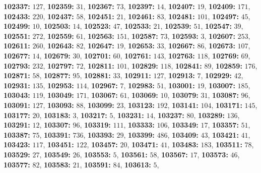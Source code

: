 \textsf{\bfseries 102337:} $127$, \textsf{\bfseries 102359:} $31$, \textsf{\bfseries 102367:} $73$, \textsf{\bfseries 102397:} $14$, \textsf{\bfseries 102407:} $19$, \textsf{\bfseries 102409:} $171$, \textsf{\bfseries 102433:} $220$, \textsf{\bfseries 102437:} $58$, \textsf{\bfseries 102451:} $21$, \textsf{\bfseries 102461:} $83$, \textsf{\bfseries 102481:} $101$, \textsf{\bfseries 102497:} $45$, \textsf{\bfseries 102499:} $10$, \textsf{\bfseries 102503:} $14$, \textsf{\bfseries 102523:} $47$, \textsf{\bfseries 102533:} $21$, \textsf{\bfseries 102539:} $51$, \textsf{\bfseries 102547:} $39$, \textsf{\bfseries 102551:} $272$, \textsf{\bfseries 102559:} $61$, \textsf{\bfseries 102563:} $151$, \textsf{\bfseries 102587:} $73$, \textsf{\bfseries 102593:} $3$, \textsf{\bfseries 102607:} $253$, \textsf{\bfseries 102611:} $260$, \textsf{\bfseries 102643:} $82$, \textsf{\bfseries 102647:} $19$, \textsf{\bfseries 102653:} $33$, \textsf{\bfseries 102667:} $86$, \textsf{\bfseries 102673:} $107$, \textsf{\bfseries 102677:} $14$, \textsf{\bfseries 102679:} $30$, \textsf{\bfseries 102701:} $60$, \textsf{\bfseries 102761:} $143$, \textsf{\bfseries 102763:} $118$, \textsf{\bfseries 102769:} $69$, \textsf{\bfseries 102793:} $232$, \textsf{\bfseries 102797:} $72$, \textsf{\bfseries 102811:} $101$, \textsf{\bfseries 102829:} $118$, \textsf{\bfseries 102841:} $89$, \textsf{\bfseries 102859:} $176$, \textsf{\bfseries 102871:} $58$, \textsf{\bfseries 102877:} $95$, \textsf{\bfseries 102881:} $33$, \textsf{\bfseries 102911:} $127$, \textsf{\bfseries 102913:} $7$, \textsf{\bfseries 102929:} $42$, \textsf{\bfseries 102931:} $135$, \textsf{\bfseries 102953:} $114$, \textsf{\bfseries 102967:} $7$, \textsf{\bfseries 102983:} $51$, \textsf{\bfseries 103001:} $19$, \textsf{\bfseries 103007:} $185$, \textsf{\bfseries 103043:} $119$, \textsf{\bfseries 103049:} $171$, \textsf{\bfseries 103067:} $61$, \textsf{\bfseries 103069:} $10$, \textsf{\bfseries 103079:} $31$, \textsf{\bfseries 103087:} $96$, \textsf{\bfseries 103091:} $127$, \textsf{\bfseries 103093:} $88$, \textsf{\bfseries 103099:} $23$, \textsf{\bfseries 103123:} $192$, \textsf{\bfseries 103141:} $104$, \textsf{\bfseries 103171:} $145$, \textsf{\bfseries 103177:} $20$, \textsf{\bfseries 103183:} $3$, \textsf{\bfseries 103217:} $5$, \textsf{\bfseries 103231:} $14$, \textsf{\bfseries 103237:} $80$, \textsf{\bfseries 103289:} $136$, \textsf{\bfseries 103291:} $12$, \textsf{\bfseries 103307:} $96$, \textsf{\bfseries 103319:} $111$, \textsf{\bfseries 103333:} $106$, \textsf{\bfseries 103349:} $17$, \textsf{\bfseries 103357:} $51$, \textsf{\bfseries 103387:} $75$, \textsf{\bfseries 103391:} $736$, \textsf{\bfseries 103393:} $29$, \textsf{\bfseries 103399:} $486$, \textsf{\bfseries 103409:} $43$, \textsf{\bfseries 103421:} $41$, \textsf{\bfseries 103423:} $117$, \textsf{\bfseries 103451:} $122$, \textsf{\bfseries 103457:} $20$, \textsf{\bfseries 103471:} $41$, \textsf{\bfseries 103483:} $183$, \textsf{\bfseries 103511:} $78$, \textsf{\bfseries 103529:} $27$, \textsf{\bfseries 103549:} $26$, \textsf{\bfseries 103553:} $5$, \textsf{\bfseries 103561:} $58$, \textsf{\bfseries 103567:} $17$, \textsf{\bfseries 103573:} $46$, \textsf{\bfseries 103577:} $82$, \textsf{\bfseries 103583:} $21$, \textsf{\bfseries 103591:} $84$, \textsf{\bfseries 103613:} $5$, 
